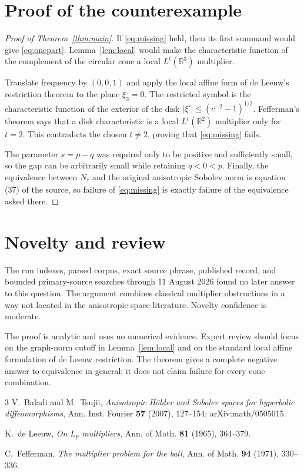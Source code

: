 \documentclass[11pt]{article}
\newcommand{\R}{\mathbb R}
\begin{document}
\section{Proof of the counterexample}

\begin{proof}[Proof of Theorem~\ref{thm:main}]
If \eqref{eq:missing} held, then its first summand would give
\eqref{eq:onepart}.  Lemma~\ref{lem:local} would make the characteristic
function of the complement of the circular cone a local $L^t(\R^3)$
multiplier.

Translate frequency by $(0,0,1)$ and apply the local affine form of de
Leeuw's restriction theorem to the plane $\xi_3=0$.  The restricted symbol
is the characteristic function of the exterior of the disk
$|\xi'|\leq(c^{-2}-1)^{1/2}$.  Fefferman's theorem says that a disk
characteristic is a local $L^t(\R^2)$ multiplier only for $t=2$.  This
contradicts the chosen $t\ne2$, proving that \eqref{eq:missing} fails.

The parameter $s=p-q$ was required only to be positive and sufficiently
small, so the gap can be arbitrarily small while retaining $q<0<p$.
Finally, the equivalence between $N_\dagger$ and the original anisotropic
Sobolev norm is equation (37) of the source, so failure of
\eqref{eq:missing} is exactly failure of the equivalence asked there.
\end{proof}

\section{Novelty and review}

The run indexes, parsed corpus, exact source phrase, published record, and
bounded primary-source searches through 11 August 2026 found no later
answer to this question.  The argument combines classical multiplier
obstructions in a way not located in the anisotropic-space literature.
Novelty confidence is moderate.

The proof is analytic and uses no numerical evidence.  Expert review should
focus on the graph-norm cutoff in Lemma~\ref{lem:local} and on the standard
local affine formulation of de Leeuw restriction.  The theorem gives a
complete negative answer to equivalence in general; it does not claim
failure for every cone combination.

\begin{thebibliography}{3}
V.~Baladi and M.~Tsujii,
\newblock \emph{Anisotropic H\"older and Sobolev spaces for hyperbolic
diffeomorphisms},
\newblock Ann. Inst. Fourier \textbf{57} (2007), 127--154;
arXiv:math/0505015.

K.~de Leeuw,
\newblock \emph{On \(L_p\) multipliers},
\newblock Ann. of Math. \textbf{81} (1965), 364--379.

C.~Fefferman,
\newblock \emph{The multiplier problem for the ball},
\newblock Ann. of Math. \textbf{94} (1971), 330--336.
\end{thebibliography}
\end{document}
